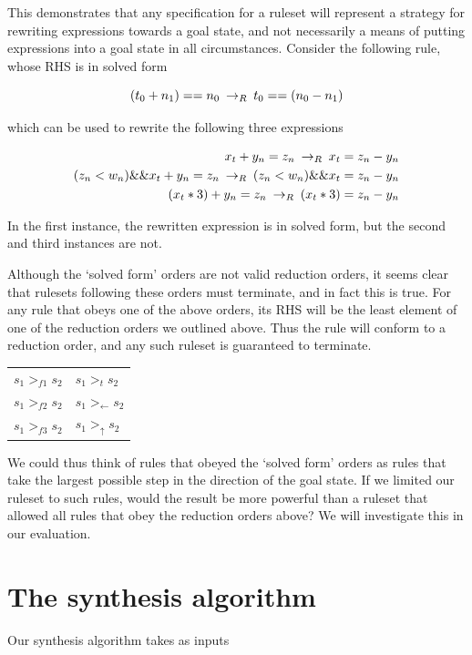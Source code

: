 This demonstrates that any specification for a ruleset will represent a strategy for rewriting expressions towards a goal state, and not necessarily a means of putting expressions into a goal state in all circumstances. Consider the following rule, whose RHS is in solved form

\[ (t_0 + n_1) == n_0 \:\rightarrow_{R}\: t_0 == (n_0 - n_1)
\]

which can be used to rewrite the following three expressions

\begin{align*}
x_t + y_n = z_n \:\rightarrow_{R}\: x_t = z_n - y_n \\
(z_n < w_n) \&\& x_t + y_n = z_n \:\rightarrow_{R}\: (z_n < w_n) \&\& x_t = z_n - y_n \\
(x_t * 3) + y_n = z_n \:\rightarrow_{R}\: (x_t * 3) = z_n - y_n 
\end{align*}

In the first instance, the rewritten expression is in solved form, but the second and third instances are not.

Although the `solved form' orders are not valid reduction orders, it seems clear that rulesets following these orders must terminate, and in fact this is true. For any rule that obeys one of the above orders, its RHS will be the least element of one of the reduction orders we outlined above. Thus the rule will conform to a reduction order, and any such ruleset is guaranteed to terminate.

\begin{tabular}{l|l}
$s_1 >_{f1} s_2$ & $s_1 >_{t} s_2$ \\
$s_1 >_{f2} s_2$ & $s_1 >_{\leftarrow} s_2$ \\
$s_1 >_{f3} s_2$ & $s_1 >_{\uparrow} s_2$
\end{tabular}

We could thus think of rules that obeyed the `solved form' orders as rules that take the largest possible step in the direction of the goal state. If we limited our ruleset to such rules, would the result be more powerful than a ruleset that allowed all rules that obey the reduction orders above? We will investigate this in our evaluation.

\section{The synthesis algorithm}

Our synthesis algorithm takes as inputs 

